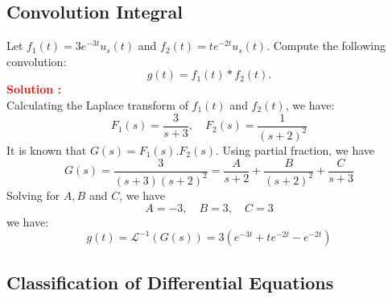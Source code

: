 \documentclass[12pt]{article}
\begin{document}
\clearpage
\subsection{Convolution Integral}

Let $f_1(t)=3e^{-3t}u_s(t)$ and $f_2(t) = te^{-2t}u_s(t)$. Compute the following convolution:
\begin{equation*}
    g(t) = f_1(t)*f_2(t).
\end{equation*}
\textbf{\textcolor{red}{Solution :}} \\

Calculating the Laplace transform of \(f_1(t)\) and \(f_2(t)\), we have:
\begin{equation}
    F_1(s) = \frac{3}{s+3}, \quad F_2(s) = \frac{1}{(s+2)^2}
\end{equation}
It is known that \(G(s) = F_1(s).F_2(s)\). Using partial fraction, we have
\begin{equation}
    G(s) = \frac{3}{(s+3)(s+2)^2} = \frac{A}{s+2} + \frac{B}{(s+2)^2} + \frac{C}{s+3}
\end{equation}
Solving for \(A,B\) and \(C\), we have
\begin{equation}
    A = -3, \quad B = 3, \quad C= 3
\end{equation}
we have:
\begin{equation}
    g(t) = \mathcal{L}^{-1}(G(s)) = 3(e^{-3t} + te^{-2t}-e^{-2t})
\end{equation}

\clearpage
\subsection{Classification of Differential Equations}
\end{document}

